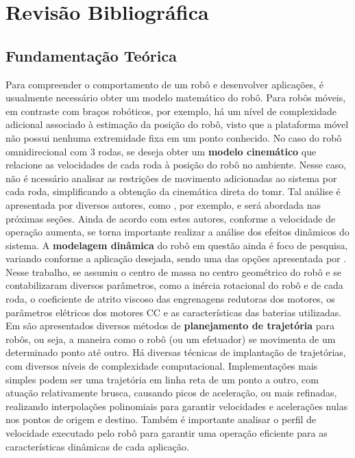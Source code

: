 \section{Revisão Bibliográfica}
\label{sec:revbib}

\subsection{Fundamentação Teórica}

Para compreender o comportamento de um robô e desenvolver aplicações, é usualmente necessário obter um modelo matemático do robô. Para robôs móveis, em contraste com braços robóticos, por exemplo, há um nível de complexidade adicional associado à estimação da posição do robô, visto que a plataforma móvel não possui nenhuma extremidade fixa em um ponto conhecido. No caso do robô omnidirecional com 3 rodas, se deseja obter um \textbf{modelo cinemático} que relacione as velocidades de cada roda à posição do robô no ambiente. Nesse caso, não é ncessário analisar as restrições de movimento adicionadas ao sistema por cada roda, simplificando a obtenção da cinemática direta do \acrlong{tomr}. Tal análise é apresentada por diversos autores, como \citet{siegwart2011introduction}, por exemplo, e será abordada nas próximas seções. Ainda de acordo com estes autores, conforme a velocidade de operação aumenta, se torna importante realizar a análise dos efeitos dinâmicos do sistema. A \textbf{modelagem dinâmica} do robô em questão ainda é foco de pesquisa, variando conforme a aplicação desejada, sendo uma das opções apresentada por \citet{kim2014minenergy}. Nesse trabalho, se assumiu o centro de massa no centro geométrico do robô e se contabilizaram diversos parâmetros, como a inércia rotacional do robô e de cada roda, o coeficiente de atrito viscoso das engrenagens redutoras dos motores, os parâmetros elétricos dos motores CC e as características das baterias utilizadas.
Em \citet{lynch2017modern} são apresentados diversos métodos de \textbf{planejamento de trajetória} para robôs, ou seja, a maneira como o robô (ou um efetuador) se movimenta de um determinado ponto até outro. Há diversas técnicas de implantação de trajetórias, com diversos níveis de complexidade computacional. Implementações mais simples podem ser uma trajetória em linha reta de um ponto a outro, com atuação relativamente brusca, causando picos de aceleração, ou mais refinadas, realizando interpolações polinomiais para garantir velocidades e acelerações nulas nos pontos de origem e destino. Também é importante analisar o perfil de velocidade executado pelo robô para garantir uma operação eficiente para as características dinâmicas de cada aplicação.

